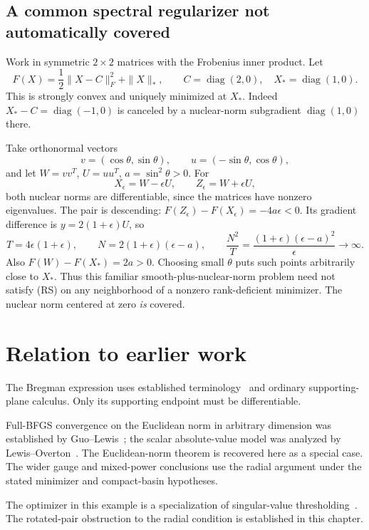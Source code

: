 

\subsection{A common spectral regularizer not automatically covered}

Work in symmetric $2\times2$ matrices with the Frobenius inner product. Let
\[
 F(X)=\frac12\|X-C\|_F^2+\|X\|_*,\qquad
 C=\operatorname{diag}(2,0),\quad X_*=\operatorname{diag}(1,0).
\]
This is strongly convex and uniquely minimized at $X_*$. Indeed $X_*-C=\operatorname{diag}(-1,0)$ is canceled by a nuclear-norm subgradient $\operatorname{diag}(1,0)$ there.

Take orthonormal vectors
\[
 v=(\cos\theta,\sin\theta),\qquad u=(-\sin\theta,\cos\theta),
\]
and let $W=vv^T$, $U=uu^T$, $a=\sin^2\theta>0$. For
\[
 X_\epsilon=W-\epsilon U,\qquad Z_\epsilon=W+\epsilon U,
\]
both nuclear norms are differentiable, since the matrices have nonzero eigenvalues. The pair is descending: $F(Z_\epsilon)-F(X_\epsilon)=-4a\epsilon<0$. Its gradient difference is $y=2(1+\epsilon)U$, so
\[
 T=4\epsilon(1+\epsilon),\qquad
 N=2(1+\epsilon)(\epsilon-a),\qquad
 \frac{N^2}{T}=\frac{(1+\epsilon)(\epsilon-a)^2}{\epsilon}\to\infty.
\]
Also $F(W)-F(X_*)=2a>0$. Choosing small $\theta$ puts such points arbitrarily close to $X_*$. Thus this familiar smooth-plus-nuclear-norm problem need not satisfy (RS) on any neighborhood of a nonzero rank-deficient minimizer. The nuclear norm centered at zero \emph{is} covered.


\endgroup


\section*{Relation to earlier work}
The Bregman expression uses established terminology~\cite[Definition~1]{BB} and ordinary supporting-plane calculus. Only its supporting endpoint must be differentiable.

Full-BFGS convergence on the Euclidean norm in arbitrary dimension was established by Guo--Lewis~\cite[Corollary~4.2]{GL18}; the scalar absolute-value model was analyzed by Lewis--Overton~\cite[Section~5.1]{LO}. The Euclidean-norm theorem is recovered here as a special case. The wider gauge and mixed-power conclusions use the radial argument under the stated minimizer and compact-basin hypotheses.

The optimizer in this example is a specialization of singular-value thresholding~\cite[Theorem~2.1]{CCS10}. The rotated-pair obstruction to the radial condition is established in this chapter.
